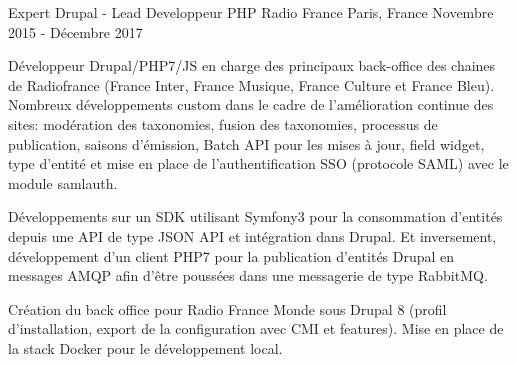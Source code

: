 \cventry
{Expert Drupal - Lead Developpeur PHP} %
{Radio France} %
{Paris, France} %
{Novembre 2015 - Décembre 2017} %
{
\begin{cvitems} %
    \item
    {
        Développeur Drupal/PHP7/JS en charge des principaux back-office des chaines de Radiofrance (France Inter, France Musique, France Culture et France Bleu). Nombreux
        développements custom dans le cadre de l'amélioration continue des sites: modération des taxonomies, fusion des taxonomies, processus de publication, saisons d’émission,
        Batch API pour les mises à jour, field widget, type d'entité et mise en place de l'authentification SSO (protocole SAML) avec le module samlauth.
    }
    \item
    {
        Développements sur un SDK utilisant Symfony3 pour la consommation d’entités depuis une API de type JSON API et intégration dans Drupal. Et inversement, développement
        d'un client PHP7 pour la publication d'entités Drupal en messages AMQP afin d'être poussées dans une messagerie de type RabbitMQ.
    }
    \item
    {
        Création du back office pour Radio France Monde sous Drupal 8 (profil d’installation, export de la configuration avec CMI et features). Mise en place de la stack Docker pour le développement local.
    }
\end{cvitems}
}
